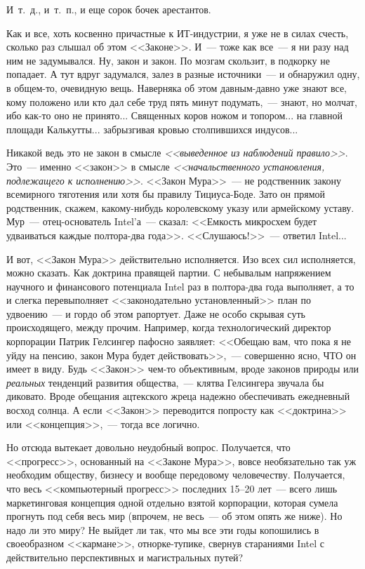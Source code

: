 \documentclass{scrbook}
\newcommand{\flqq}{<<}
\newcommand{\frqq}{>>}
\newcommand{\mdash}{~--- }
\newcommand{\ndash}{--}
\newcommand{\commamdash}{~--- } %
\begin{document}
И~т.~д., и~т.~п., и еще сорок бочек арестантов.

Как и все, хоть косвенно причастные к ИТ-индустрии, я уже не в силах счесть, сколько раз слышал об этом {\flqq}Законе{\frqq}. И{\mdash}тоже как все{\mdash}я ни разу над ним не задумывался. Ну, закон и закон. По мозгам скользит, в подкорку не попадает. А тут вдруг задумался, залез в разные источники{\mdash}и обнаружил одну, в общем-то, очевидную вещь. Наверняка об этом давным-давно уже знают все, кому положено или кто дал себе труд пять минут подумать,{\commamdash}знают, но молчат, ибо как-то оно не принято... Священных коров ножом и топором... на главной площади Калькутты... забрызгивая кровью столпившихся индусов...

Никакой ведь это не закон в смысле \emph{{\flqq}выведенное из наблюдений правило{\frqq}}. Это{\mdash}именно {\flqq}закон{\frqq} в смысле \emph{{\flqq}начальственного установления, подлежащего к исполнению{\frqq}}. {\flqq}Закон Мура{\frqq}{\mdash}не родственник закону всемирного тяготения или хотя бы правилу Тициуса-Боде. Зато он прямой родственник, скажем, какому-нибудь королевскому указу или армейскому уставу. Мур{\mdash}отец-основатель Intel'а{\mdash}сказал: {\flqq}Емкость микросхем будет удваиваться каждые полтора-два года{\frqq}. {\flqq}Слушаюсь!{\frqq}{\mdash}ответил Intel...

И вот, {\flqq}Закон Мура{\frqq} действительно исполняется. Изо всех сил исполняется, можно сказать. Как доктрина правящей партии. С небывалым напряжением научного и финансового потенциала Intel раз в полтора-два года выполняет, а то и слегка перевыполняет {\flqq}законодательно установленный{\frqq} план по удвоению{\mdash}и гордо об этом рапортует. Даже не особо скрывая суть происходящего, между прочим. Например, когда технологический директор корпорации Патрик Гелсингер пафосно заявляет: {\flqq}Обещаю вам, что пока я не уйду на пенсию, закон Мура будет действовать{\frqq},{\commamdash}совершенно ясно, ЧТО он имеет в виду. Будь {\flqq}Закон{\frqq} чем-то объективным, вроде законов природы или \emph{реальных} тенденций развития общества,{\commamdash}клятва Гелсингера звучала бы диковато. Вроде обещания ацтекского жреца надежно обеспечивать ежедневный восход солнца. А если {\flqq}Закон{\frqq} переводится попросту как {\flqq}доктрина{\frqq} или {\flqq}концепция{\frqq},{\commamdash}тогда все логично.

Но отсюда вытекает довольно неудобный вопрос. Получается, что {\flqq}прогресс{\frqq}, основанный на {\flqq}Законе Мура{\frqq}, вовсе необязательно так уж необходим обществу, бизнесу и вообще передовому человечеству. Получается, что весь {\flqq}компьютерный прогресс{\frqq} последних 15{\ndash}20 лет{\mdash}всего лишь маркетинговая концепция одной отдельно взятой корпорации, которая сумела прогнуть под себя весь мир (впрочем, не весь{\mdash}об этом опять же ниже). Но надо ли это миру? Не выйдет ли так, что мы все эти годы копошились в своеобразном {\flqq}кармане{\frqq}, отнорке-тупике, свернув стараниями Intel с действительно перспективных и магистральных путей?
\end{document}
